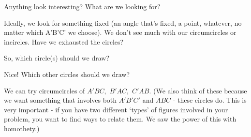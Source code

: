 Anything look interesting? What are we looking for?

Ideally, we look for something fixed (an angle that's fixed, a point, whatever, no matter which A'B'C' we choose). We don't see much with our circumcircles or incircles. Have we exhausted the circles?


So, which circle(s) should we draw?



Nice! Which other circles should we draw?







We can try circumcircles of $A'BC,$ $B'AC,$ $C'AB.$ (We also think of these because we want something that involves both $A'B'C'$ and $ABC$ - these circles do. This is very important - if you have two different `types' of figures involved in your problem, you want to find ways to relate them. We saw the power of this with homothety.)




